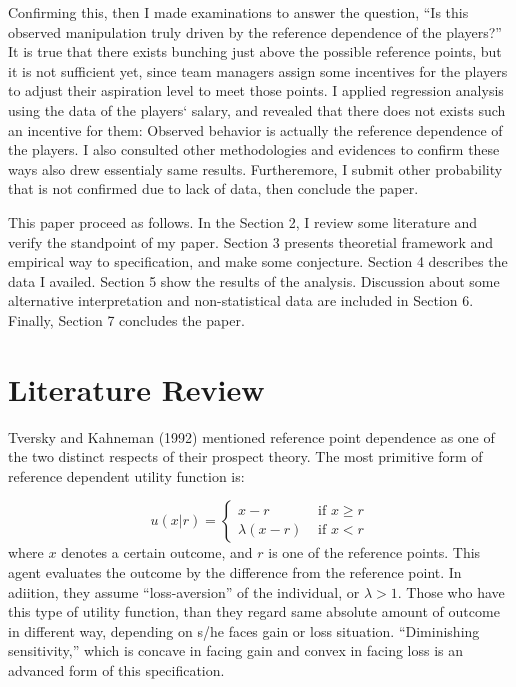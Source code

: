 \documentclass[dvipdfmx, 12pt]{article}
\begin{document}
Confirming this, then I made examinations to answer the question, ``Is this observed manipulation truly driven by the reference dependence of the players?'' It is true that there exists bunching just above the possible reference points, but it is not sufficient yet, since team managers assign some incentives for the players to adjust their aspiration level to meet those points. I applied regression analysis using the data of the players` salary, and revealed that there does not exists such an incentive for them: Observed behavior is actually the reference dependence of the players. I also consulted other methodologies and evidences to confirm these ways also drew essentialy same results. Furtheremore, I submit other probability that is not confirmed due to lack of data, then conclude the paper.

This paper proceed as follows. In the Section 2, I review some literature and verify the standpoint of my paper. Section 3 presents theoretial framework and empirical way to specification, and make some conjecture. Section 4 describes the data I availed. Section 5 show the results of the analysis. Discussion about some alternative interpretation and non-statistical data are included in Section 6. Finally, Section 7 concludes the paper.

\section{Literature Review}

  Tversky and Kahneman (1992) mentioned reference point dependence as one of the two distinct respects of their prospect theory. The most primitive form of reference dependent utility function is:

   \[
  u(x | r) = \begin{cases}
  x - r & \text{ if }x \geq r \\
  \lambda (x - r) & \text{ if }x < r
\end{cases}
  \]
  where $x$ denotes a certain outcome, and $r$ is one of the reference points. This agent evaluates the outcome by the difference from the reference point. In adiition, they assume ``loss-aversion'' of the individual, or $\lambda > 1$. Those who have this type of utility function, than they regard same absolute amount of outcome in different way, depending on s/he faces gain or loss situation. ``Diminishing sensitivity,'' which is concave in facing gain and convex in facing loss is an advanced form of this specification.
\end{document}

